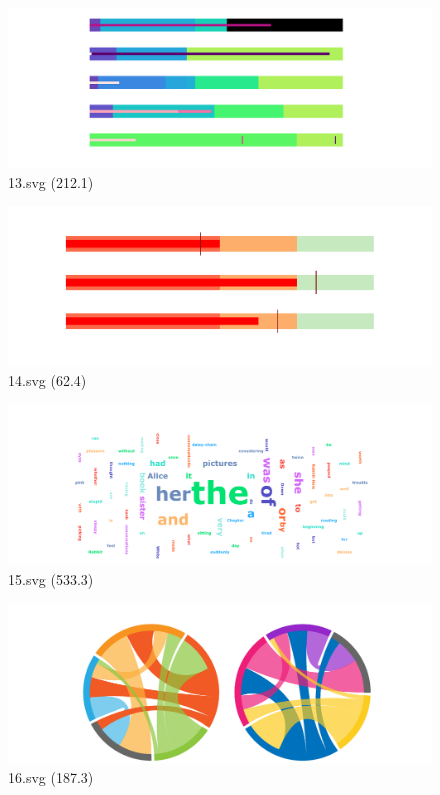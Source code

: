\documentclass[journal]{IEEEtran}
\begin{document}
\begin{figure}[!htbp]
\centering
\begin{minipage}{0.233\columnwidth}
\centering
\includegraphics[width=\textwidth]{Train_set/13.pdf}
{13.svg (212.1)}
\end{minipage}
\hfill
\begin{minipage}{0.233\columnwidth}
\centering
\includegraphics[width=\textwidth]{Train_set/14.pdf}
{14.svg (62.4)}
\end{minipage}
\hfill
\begin{minipage}{0.233\columnwidth}
\centering
\includegraphics[width=\textwidth]{Train_set/15.pdf}
{15.svg (533.3)}
\end{minipage}
\hfill
\begin{minipage}{0.233\columnwidth}
\centering
\includegraphics[width=\textwidth]{Train_set/16.pdf}
{16.svg (187.3)}
\end{minipage}
\end{figure}
\end{document}
